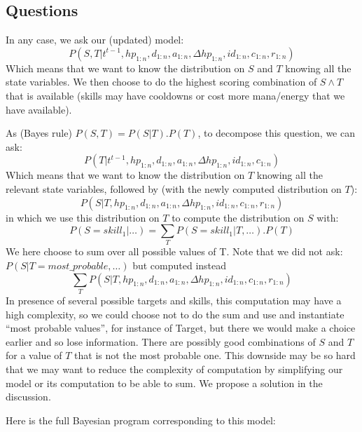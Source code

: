 \subsection{Questions}

In any case, we ask our (updated) model:\\
\begin{equation}
P(S,T|t^{t-1},hp_{1:n},d_{1:n}, a_{1:n}, \Delta hp_{1:n}, id_{1:n}, c_{1:n}, r_{1:n})
\end{equation}
Which means that we want to know the distribution on $S$ and $T$ knowing all the state variables. We then choose to do the highest scoring combination of $S \wedge T$ that is available (skills may have cooldowns or cost more mana/energy that we have available).

As (Bayes rule) $P(S,T) = P(S|T).P(T)$, to decompose this question, we can ask:
$$P(T | t^{t-1}, hp_{1:n},d_{1:n}, a_{1:n}, \Delta hp_{1:n}, id_{1:n}, c_{1:n})$$ 
Which means that we want to know the distribution on $T$ knowing all the relevant state variables, followed by (with the newly computed distribution on $T$):
$$P(S | T, hp_{1:n},d_{1:n}, a_{1:n}, \Delta hp_{1:n}, id_{1:n}, c_{1:n}, r_{1:n})$$ 
in which we use this distribution on $T$ to compute the distribution on $S$ with:
$$P(S=skill_1 | \dots) = \sum_T P(S=skill_1 | T, \dots).P(T)$$
We here choose to sum over all possible values of T. Note that we did not ask:\\
$P(S|T=most\_probable , \dots)$ but computed instead
$$\sum_T P(S|T,hp_{1:n},d_{1:n}, a_{1:n}, \Delta hp_{1:n}, id_{1:n}, c_{1:n}, r_{1:n})$$
In presence of several possible targets and skills, this computation may have a high complexity, so we could choose not to do the sum and use and instantiate ``most probable values'', for instance of Target, but there we would make a choice earlier and so lose information. There are possibly good combinations of $S$ and $T$ for a value of $T$ that is not the most probable one. This downside may be so hard that we may want to reduce the complexity of computation by simplifying our model or its computation to be able to sum. We propose a solution in the discussion.


Here is the full Bayesian program corresponding to this model:

